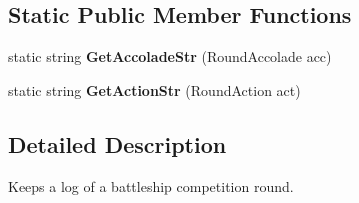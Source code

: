 \subsection*{Static Public Member Functions}
\begin{DoxyCompactItemize}
\item 
\hypertarget{class_m_b_c_1_1_core_1_1_round_log_a924ae02c6cfb5a5b187f41abf4e28c7f}{static string {\bfseries Get\-Accolade\-Str} (Round\-Accolade acc)}\label{class_m_b_c_1_1_core_1_1_round_log_a924ae02c6cfb5a5b187f41abf4e28c7f}

\item 
\hypertarget{class_m_b_c_1_1_core_1_1_round_log_af2e4d05049f7d8a4db1895162afe4538}{static string {\bfseries Get\-Action\-Str} (Round\-Action act)}\label{class_m_b_c_1_1_core_1_1_round_log_af2e4d05049f7d8a4db1895162afe4538}

\end{DoxyCompactItemize}


\subsection{Detailed Description}
Keeps a log of a battleship competition round.

